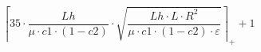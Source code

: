 \[\left\lceil 35 \cdot \frac{Lh}{\mu \cdot c1 \cdot \left(1 - c2\right)} \cdot \sqrt{\frac{Lh \cdot L \cdot R^{2}}{\mu \cdot c1 \cdot \left(1 - c2\right) \cdot \varepsilon}} \right\rceil_{+} + 1\]
